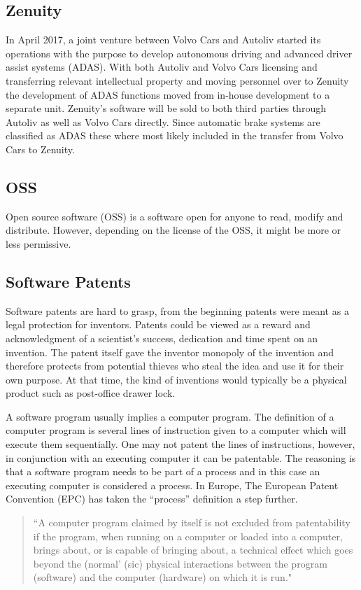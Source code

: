 \documentclass[conference]{IEEEtran}
\begin{document}
\subsection{Zenuity}
In April 2017, a joint venture between Volvo Cars and Autoliv started its operations with the purpose to develop autonomous driving and advanced driver assist systems (ADAS). With both Autoliv and Volvo Cars licensing and transferring relevant intellectual property and moving personnel over to Zenuity the development of ADAS functions moved from in-house development to a separate unit. Zenuity's software will be sold to both third parties through Autoliv as well as Volvo Cars directly. \cite{ZenuityLaunch} Since automatic brake systems are classified as ADAS these where most likely included in the transfer from Volvo Cars to Zenuity.

\subsection{OSS}
Open source software (OSS) is a software open for anyone to read, modify and distribute. However, depending on the license of the OSS, it might be more or less permissive. \cite{OSS}

\subsection{Software Patents}
Software patents are hard to grasp, from the beginning patents were meant as a legal protection for inventors. Patents could be viewed as a reward and acknowledgment of a scientist's success, dedication and time spent on an invention. The patent itself gave the inventor monopoly of the invention and therefore protects from potential thieves who steal the idea and use it for their own purpose. \cite{SoftwarePatent} At that time, the kind of inventions would typically be a physical product such as post-office drawer lock. \cite{LockPatent}

A software program usually implies a computer program. The definition of a computer program is several lines of instruction given to a computer which will execute them sequentially. One may not patent the lines of instructions, however, in conjunction with an executing computer it can be patentable. The reasoning is that a software program needs to be part of a process and in this case an executing computer is considered a process. In Europe, The European Patent Convention (EPC) has taken the ``process'' definition a step further. \cite{SoftwarePatent}
\begin{quotation}
``A computer program claimed by itself is not excluded from patentability if the program, when running on a computer or loaded into a computer, brings about, or is capable of bringing about, a technical effect which goes beyond the (normal' (sic) physical interactions between the program (software) and the computer (hardware) on which it is run." \cite[p. 36]{SoftwarePatent}
\end{quotation} 
\end{document}
